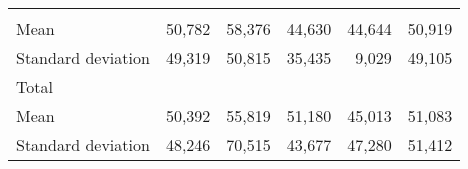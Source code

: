 \begin{tabular}{llllll}
  \multicolumn{1}{r}{} &
  \multicolumn{1}{r}{} &
  \multicolumn{1}{r}{} &
  \multicolumn{1}{r}{} \\
\multicolumn{1}{l}{\hspace{4em}Mean} &
  \multicolumn{1}{|r}{50,782} &
  \multicolumn{1}{r}{58,376} &
  \multicolumn{1}{r}{44,630} &
  \multicolumn{1}{r}{44,644} &
  \multicolumn{1}{r}{50,919} \\
\multicolumn{1}{l}{\hspace{4em}Standard deviation} &
  \multicolumn{1}{|r}{49,319} &
  \multicolumn{1}{r}{50,815} &
  \multicolumn{1}{r}{35,435} &
  \multicolumn{1}{r}{9,029} &
  \multicolumn{1}{r}{49,105} \\
\multicolumn{1}{l}{\hspace{3em}Total} &
  \multicolumn{1}{|r}{} &
  \multicolumn{1}{r}{} &
  \multicolumn{1}{r}{} &
  \multicolumn{1}{r}{} &
  \multicolumn{1}{r}{} \\
\multicolumn{1}{l}{\hspace{4em}Mean} &
  \multicolumn{1}{|r}{50,392} &
  \multicolumn{1}{r}{55,819} &
  \multicolumn{1}{r}{51,180} &
  \multicolumn{1}{r}{45,013} &
  \multicolumn{1}{r}{51,083} \\
\multicolumn{1}{l}{\hspace{4em}Standard deviation} &
  \multicolumn{1}{|r}{48,246} &
  \multicolumn{1}{r}{70,515} &
  \multicolumn{1}{r}{43,677} &
  \multicolumn{1}{r}{47,280} &
  \multicolumn{1}{r}{51,412} \\
\cline{1-6}
\end{tabular}

